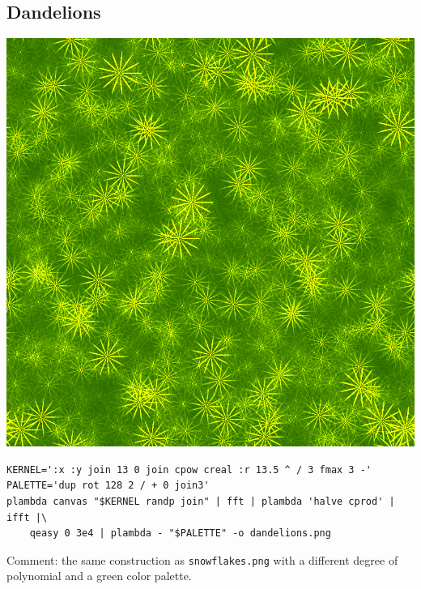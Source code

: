 \subsection{Dandelions}
\includegraphics{dandelions.png}
\begin{verbatim}
KERNEL=':x :y join 13 0 join cpow creal :r 13.5 ^ / 3 fmax 3 -'
PALETTE='dup rot 128 2 / + 0 join3'
plambda canvas "$KERNEL randp join" | fft | plambda 'halve cprod' | ifft |\
	qeasy 0 3e4 | plambda - "$PALETTE" -o dandelions.png
\end{verbatim}
Comment: the same construction as \verb+snowflakes.png+ with a different
degree of polynomial and a green color palette.


